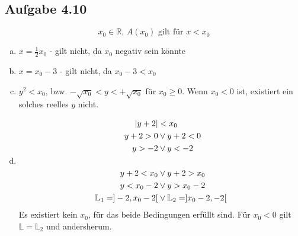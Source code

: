 \documentclass{standalone}
\begin{document}
\subsection{Aufgabe 4.10}
$$x_0 \in \mathbb{R} \text{, } A(x_0) \text{ gilt für } x < x_0$$
\begin{enumerate}[a)]
    \item $x =\frac{1}{2}x_0$ - gilt nicht, da $x_0$ negativ sein könnte
    \item $x =x_0 - 3$ - gilt nicht, da $x_0 - 3 < x_0$
    \item $y^2 < x_0$, bzw. $-\sqrt{x_0} < y < +\sqrt{x_0}$ für $x_0 \geq 0$. Wenn $x_0 < 0$ ist, existiert ein solches reelles $y$ nicht.
    \item \begin{align}
        \lvert y+2\rvert &< x_0 \\
        y+2 > 0 &\vee y+2 < 0 \\
        y > -2 &\vee y < -2 \\
        \\
        y+2 < x_0 &\vee y+2 > x_0 \\
        y < x_0 -2 &\vee y > x_0 -2 \\
        \mathbb{L}_1 = ]-2,x_0 -2[ &\vee \mathbb{L}_2 = ]x_0-2, -2[
    \end{align}
    Es existiert kein $x_0$, für das beide Bedingungen erfüllt sind.
    Für $x_0 < 0$ gilt $\mathbb{L} = \mathbb{L}_2$ und andersherum.
\end{enumerate}
\end{document}
